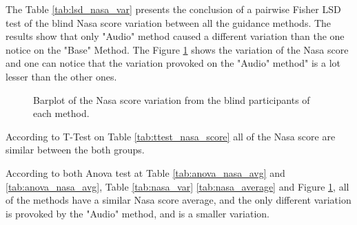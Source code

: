 



The Table \ref{tab:lsd_nasa_var} presents the conclusion of a pairwise Fisher LSD test of the blind Nasa score variation between all the guidance methods. The results show that only "Audio" method caused a different variation than the one notice on the "Base" Method. The Figure \ref{fig:barplot_nasa_var_scene_blind} shows the variation of the Nasa score and one can notice that the variation provoked on the "Audio" method" is a lot lesser than the other ones.





\begin{figure}[!htb]
    \centering
    \resizebox{0.6\linewidth}{!}{
    
    }
    \caption{Barplot of the Nasa score variation from the blind participants of each method.}
    \label{fig:barplot_nasa_var_scene_blind}
\end{figure}

According to T-Test on Table \ref{tab:ttest_nasa_score} all of the Nasa score are similar between the both groups.

According to both Anova test at Table \ref{tab:anova_nasa_avg} and \ref{tab:anova_nasa_avg}, Table \ref{tab:nasa_var} \ref{tab:nasa_average} and Figure \ref{fig:barplot_nasa_var_scene_blind}, all of the methods have a similar Nasa score average, and the only different variation is provoked by the "Audio" method, and is a smaller variation.

\FloatBarrier
